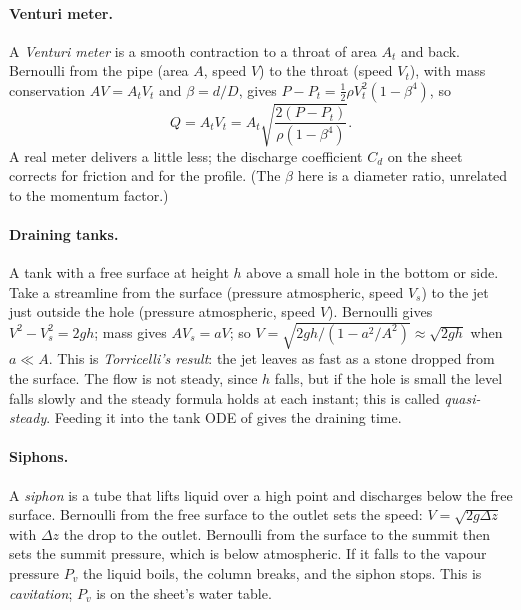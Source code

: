 \paragraph{Venturi meter.} A \emph{Venturi meter} is a smooth contraction to a throat of area $A_t$ and back. Bernoulli from the pipe (area $A$, speed $V$) to the throat (speed $V_t$), with mass conservation $AV = A_tV_t$ and $\beta = d/D$, gives $P - P_t = \tfrac12\rho V_t^2(1 - \beta^4)$, so
\[
Q = A_tV_t = A_t\sqrt{\frac{2(P - P_t)}{\rho(1 - \beta^4)}} .
\]
A real meter delivers a little less; the discharge coefficient $C_d$ on the sheet corrects for friction and for the profile. (The $\beta$ here is a diameter ratio, unrelated to the momentum factor.)

\paragraph{Draining tanks.} A tank with a free surface at height $h$ above a small hole in the bottom or side. Take a streamline from the surface (pressure atmospheric, speed $V_s$) to the jet just outside the hole (pressure atmospheric, speed $V$). Bernoulli gives $V^2 - V_s^2 = 2gh$; mass gives $AV_s = aV$; so $V = \sqrt{2gh/(1 - a^2/A^2)} \approx \sqrt{2gh}$ when $a \ll A$. This is \emph{Torricelli's result}: the jet leaves as fast as a stone dropped from the surface. The flow is not steady, since $h$ falls, but if the hole is small the level falls slowly and the steady formula holds at each instant; this is called \emph{quasi-steady}. Feeding it into the tank ODE of  gives the draining time.

\paragraph{Siphons.} A \emph{siphon} is a tube that lifts liquid over a high point and discharges below the free surface. Bernoulli from the free surface to the outlet sets the speed: $V = \sqrt{2g\Delta z}$ with $\Delta z$ the drop to the outlet. Bernoulli from the surface to the summit then sets the summit pressure, which is below atmospheric. If it falls to the vapour pressure $P_v$ the liquid boils, the column breaks, and the siphon stops. This is \emph{cavitation}; $P_v$ is on the sheet's water table.

